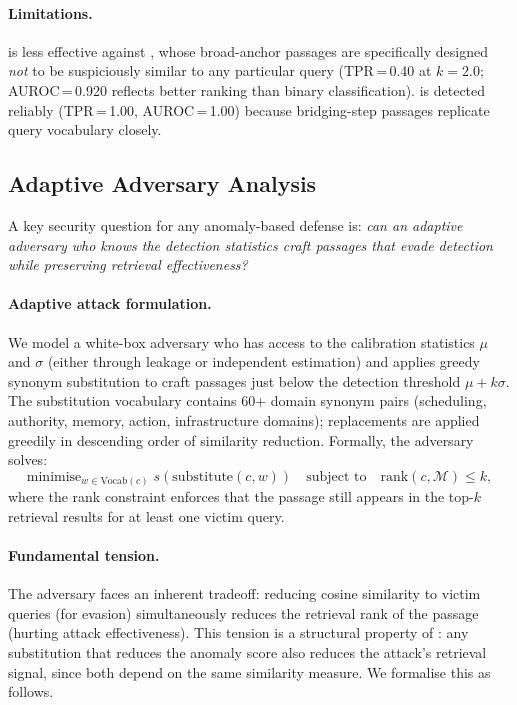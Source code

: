 \paragraph{Limitations.}
\sad{} is less effective against \injecmem{}, whose broad-anchor passages are
specifically designed \emph{not} to be suspiciously similar to any particular
query (TPR\,=\,0.40 at $k=2.0$; AUROC\,=\,0.920 reflects better ranking
than binary classification).  \minja{} is detected reliably (TPR\,=\,1.00,
AUROC\,=\,1.00) because bridging-step passages replicate query vocabulary
closely.

\subsection{Adaptive Adversary Analysis}
\label{sec:adaptive}

A key security question for any anomaly-based defense is: \emph{can an
adaptive adversary who knows the detection statistics craft passages that
evade detection while preserving retrieval effectiveness?}

\paragraph{Adaptive attack formulation.}
We model a white-box adversary who has access to the calibration statistics
$\mu$ and $\sigma$ (either through leakage or independent estimation) and
applies greedy synonym substitution to craft passages just below the detection
threshold $\mu + k\sigma$.  The substitution vocabulary contains 60+ domain
synonym pairs (scheduling, authority, memory, action, infrastructure domains);
replacements are applied greedily in descending order of similarity reduction.
Formally, the adversary solves:
\begin{equation}
  \text{minimise}_{w \in \text{Vocab}(c)}\;
  s(\text{substitute}(c, w))
  \quad\text{subject to}\quad
  \text{rank}(c, \mathcal{M}) \leq k,
  \label{eq:adaptive_obj}
\end{equation}
where the rank constraint enforces that the passage still appears in the
top-$k$ retrieval results for at least one victim query.

\paragraph{Fundamental tension.}
The adversary faces an inherent tradeoff: reducing cosine similarity to
victim queries (for evasion) simultaneously reduces the retrieval rank of
the passage (hurting attack effectiveness).  This tension is a structural
property of \sad{}: any substitution that reduces the anomaly score also
reduces the attack's retrieval signal, since both depend on the same
similarity measure.  We formalise this as follows.

